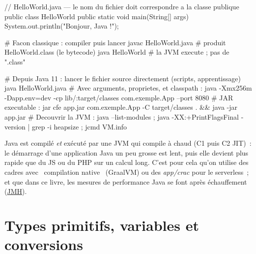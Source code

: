 \documentclass[12pt,a4paper,twoside,openright]{book}
\newcommand{\link}[2]{\href{#2}{#1}}
\begin{document}
\begin{codejava}
// HelloWorld.java --- le nom du fichier doit correspondre a la classe publique
public class HelloWorld {
    public static void main(String[] args) {
        System.out.println("Bonjour, Java !");
    }
}
\end{codejava}

\begin{terminal}
# Facon classique : compiler puis lancer
javac HelloWorld.java            # produit HelloWorld.class (le bytecode)
java HelloWorld                  # la JVM execute ; pas de ".class"

# Depuis Java 11 : lancer le fichier source directement (scripts, apprentissage)
java HelloWorld.java
# Avec arguments, proprietes, et classpath :
java -Xmx256m -Dapp.env=dev -cp lib/\*:target/classes com.exemple.App --port 8080
# JAR executable :
jar cfe app.jar com.exemple.App -C target/classes . && java -jar app.jar
# Decouvrir la JVM :
java --list-modules ; java -XX:+PrintFlagsFinal -version | grep -i heapsize ; jcmd VM.info
\end{terminal}

\begin{note}
Java est compil\'e \emph{et} ex\'ecut\'e par une JVM qui compile \`a chaud (C1 puis C2 JIT)~: le
d\'emarrage d'une application Java un peu grosse est lent, puis elle devient plus rapide que du JS
ou du PHP sur un calcul long. C'est pour cela qu'on utilise des cadres avec \og ~compilation
native~ \fg{} (GraalVM) ou des \emph{app/crac} pour le serverless~; et que dans ce livre, les mesures
de performance Java se font apr\`es \'echauffement (\link{JMH}{https://github.com/openjdk/jmh}).
\end{note}

\section{Types primitifs, variables et conversions}
\end{document}
